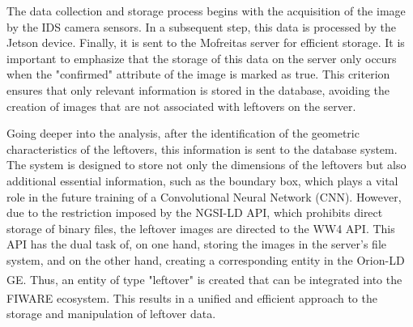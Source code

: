 The data collection and storage process begins with the acquisition of the image by the IDS camera sensors. In a subsequent step, this data is processed by the Jetson device. Finally, it is sent to the Mofreitas server for efficient storage. It is important to emphasize that the storage of this data on the server only occurs when the "confirmed" attribute of the image is marked as true. This criterion ensures that only relevant information is stored in the database, avoiding the creation of images that are not associated with leftovers on the server.

Going deeper into the analysis, after the identification of the geometric characteristics of the leftovers, this information is sent to the database system. The system is designed to store not only the dimensions of the leftovers but also additional essential information, such as the boundary box, which plays a vital role in the future training of a Convolutional Neural Network (CNN). However, due to the restriction imposed by the NGSI-LD API, which prohibits direct storage of binary files, the leftover images are directed to the WW4 API. This API has the dual task of, on one hand, storing the images in the server's file system, and on the other hand, creating a corresponding entity in the Orion-LD GE\textsuperscript{\textregistered}. Thus, an entity of type "leftover" is created that can be integrated into the FIWARE\textsuperscript{\textregistered} ecosystem. This results in a unified and efficient approach to the storage and manipulation of leftover data.

